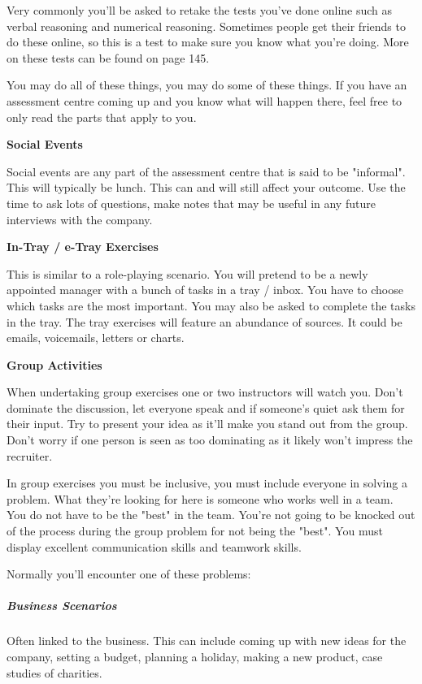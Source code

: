 \documentclass{article}
\begin{document}
Very commonly you'll be asked to retake the tests you've done online
such as verbal reasoning and numerical reasoning. Sometimes people get
their friends to do these online, so this is a test to make sure you
know what you're doing. More on these tests can be found on page 145.

You may do all of these things, you may do some of these things. If you
have an assessment centre coming up and you know what will happen there,
feel free to only read the parts that apply to you.

\textbf{Social Events}

Social events are any part of the assessment centre that is said to be
"informal". This will typically be lunch. This can and will still
affect your outcome. Use the time to ask lots of questions, make notes
that may be useful in any future interviews with the company.

\textbf{In-Tray / e-Tray Exercises}

This is similar to a role-playing scenario. You will pretend to be a
newly appointed manager with a bunch of tasks in a tray / inbox. You
have to choose which tasks are the most important. You may also be asked
to complete the tasks in the tray. The tray exercises will feature an
abundance of sources. It could be emails, voicemails, letters or charts.

\textbf{Group Activities}

When undertaking group exercises one or two instructors will watch you.
Don't dominate the discussion, let everyone speak and if someone's quiet
ask them for their input. Try to present your idea as it'll make you
stand out from the group. Don't worry if one person is seen as too
dominating as it likely won't impress the recruiter.

In group exercises you must be inclusive, you must include everyone in
solving a problem. What they're looking for here is someone who works
well in a team. You do not have to be the "best" in the team. You're not
going to be knocked out of the process during the group problem for not
being the "best". You must display excellent communication skills and
teamwork skills.

Normally you'll encounter one of these problems:

\subparagraph{Business Scenarios}

Often linked to the business. This can include coming up with new ideas
for the company, setting a budget, planning a holiday, making a new
product, case studies of charities.
\end{document}
